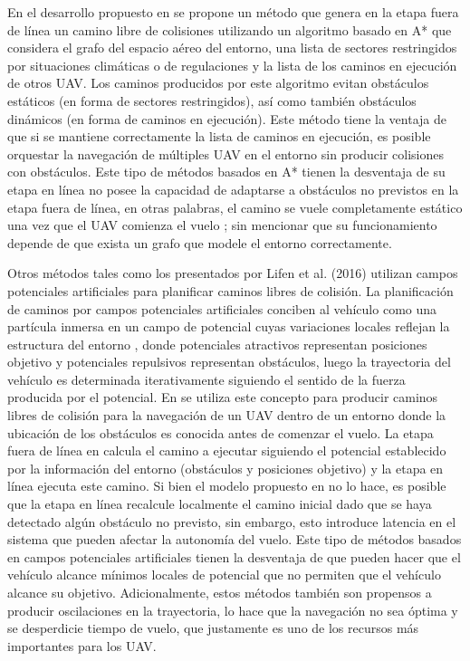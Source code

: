 En el desarrollo propuesto en \cite{shi2018collision} se propone un método que genera en la etapa fuera de línea un camino libre de colisiones utilizando un algoritmo basado en A* que considera el grafo del espacio aéreo del entorno, una lista de sectores restringidos por situaciones climáticas o de regulaciones y la lista de los caminos en ejecución de otros UAV. Los caminos producidos por este algoritmo evitan obstáculos estáticos (en forma de sectores restringidos), así como también obstáculos dinámicos (en forma de caminos en ejecución). Este método tiene la ventaja de que si se mantiene correctamente la lista de caminos en ejecución, es posible orquestar la navegación de múltiples UAV en el entorno sin producir colisiones con obstáculos. Este tipo de métodos basados en A* tienen la desventaja de su etapa en línea no posee la capacidad de adaptarse a obstáculos no previstos en la etapa fuera de línea, en otras palabras, el camino se vuele completamente estático una vez que el UAV comienza el vuelo \cite{park2020boundary}; sin mencionar que su funcionamiento depende de que exista un grafo que modele el entorno correctamente.

Otros métodos tales como los presentados por Lifen et al. (2016) \cite{lifen2016path} utilizan campos potenciales artificiales para planificar caminos libres de colisión. La planificación de caminos por campos potenciales artificiales conciben al vehículo como una partícula inmersa en un campo de potencial cuyas variaciones locales reflejan la estructura del entorno \cite{bermudez2004aplicacion}, donde potenciales atractivos representan posiciones objetivo y potenciales repulsivos representan obstáculos, luego la trayectoria del vehículo es determinada iterativamente siguiendo el sentido de la fuerza producida por el potencial. En \cite{lifen2016path} se utiliza este concepto para producir caminos libres de colisión para la navegación de un UAV dentro de un entorno donde la ubicación de los obstáculos es conocida antes de comenzar el vuelo. La etapa fuera de línea en \cite{lifen2016path} calcula el camino a ejecutar siguiendo el potencial establecido por la información del entorno (obstáculos y posiciones objetivo) y la etapa en línea ejecuta este camino. Si bien el modelo propuesto en \cite{lifen2016path} no lo hace, es posible que la etapa en línea recalcule localmente el camino inicial dado que se haya detectado algún obstáculo no previsto, sin embargo, esto introduce latencia en el sistema que pueden afectar la autonomía del vuelo. Este tipo de métodos basados en campos potenciales artificiales tienen la desventaja de que pueden hacer que el vehículo alcance mínimos locales de potencial que no permiten que el vehículo alcance su objetivo. Adicionalmente, estos métodos también son propensos a producir oscilaciones en la trayectoria, lo hace que la navegación no sea óptima y se desperdicie tiempo de vuelo, que justamente es uno de los recursos más importantes para los UAV.


